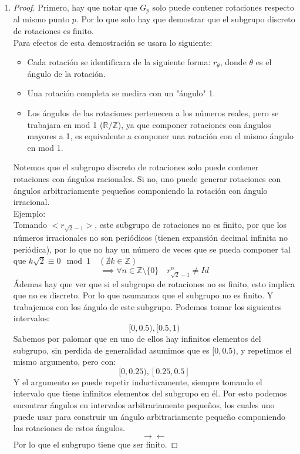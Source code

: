 \documentclass[11pt]{article}
\newcommand{\set}[1]{\mathbb{#1}}
\newcommand{\contr}{\rightarrow\leftarrow}
\theoremstyle{definition}
\begin{document}
\begin{enumerate}[label=(\alph*)]
    \item \begin{proof}
        Primero, hay que notar que $G_p$ solo puede contener rotaciones respecto al mismo punto $p$. Por lo que solo hay que demostrar que el subgrupo discreto de rotaciones es finito.\\
        Para efectos de esta demostración se usara lo siguiente:
        \begin{itemize}
            \item Cada rotación se identificara de la siguiente forma: $r_\theta$, donde $\theta$ es el ángulo de la rotación.
            
            \item Una rotación completa se medira con un "ángulo" 1.

            \item Los ángulos de las rotaciones pertenecen a los números reales, pero se trabajara en mod 1 ($\set{R}/\set{Z}$), ya que componer rotaciones con ángulos mayores a 1, es equivalente a componer una rotación con el mismo ángulo en mod 1.
        \end{itemize}
        Notemos que el subgrupo discreto de rotaciones solo puede contener rotaciones con ángulos racionales. Si no, uno puede generar rotaciones con ángulos arbitrariamente pequeños componiendo la rotación con ángulo irracional.\\
        Ejemplo:\\
        Tomando $<r_{\sqrt{2}-1}>$, este subgrupo de rotaciones no es finito, por que los números irracionales no son periódicos (tienen expansión decimal infinita no periódica), por lo que no hay un número de veces que se pueda componer tal que $k\sqrt{2}\equiv 0 \mod 1\quad (\nexists k\in\set{Z})$
        \[\implies \forall n\in\set{Z}\setminus\{0\}\quad r_{\sqrt{2}-1}^n\neq Id\]
        Ádemas hay que ver que si el subgrupo de rotaciones no es finito, esto implica que no es discreto. Por lo que asumamos que el subgrupo no es finito. Y trabajemos con los ángulo de este subgrupo. Podemos tomar los siguientes intervalos:
        \[[0,0.5),[0.5,1)\]
        Sabemos por palomar que en uno de ellos hay infinitos elementos del subgrupo, sin perdida de generalidad asumimos que es $[0,0.5)$, y repetimos el mismo argumento, pero con:
        \[[0,0.25),[0.25,0.5]\]
        Y el argumento se puede repetir inductivamente, siempre tomando el intervalo que tiene infinitos elementos del subgrupo en él. Por esto podemos encontrar ángulos en intervalos arbitrariamente pequeños, los cuales uno puede usar para construir un ángulo arbitrariamente pequeño componiendo las rotaciones de estos ángulos.
        \[\contr\]
        Por lo que el subgrupo tiene que ser finito.
    \end{proof}


\end{enumerate}
\end{document}
